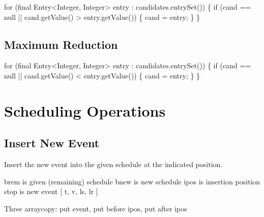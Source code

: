 \nwenddocs{}\endmoddef\nwstartdeflinemarkup{}\nwenddeflinemarkup
for (final Entry<Integer, Integer> entry : candidates.entrySet()) \{
  if (cand == null || cand.getValue() > entry.getValue()) \{
    cand = entry;
  \}
\}
\nwendcode{}\nwdocspar

\section{Maximum Reduction}

\nwenddocs{}\endmoddef\nwstartdeflinemarkup\nwenddeflinemarkup
for (final Entry<Integer, Integer> entry : candidates.entrySet()) \{
  if (cand == null || cand.getValue() < entry.getValue()) \{
    cand = entry;
  \}
\}
\nwendcode{}\nwdocspar

\nwenddocs{}\chapter{Scheduling Operations}
\label{search-scheduling}

\section{Insert New Event}

Insert the new event into the given schedule at the indicated position.

brem is given (remaining) schedule
bnew is new schedule
ipos is insertion position
stop is new event [ t, v, ls, lr ]

Three arraycopy: put event, put before ipos, put after ipos

